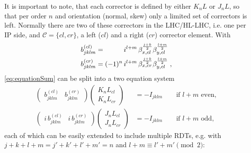 It is important to note, that each corrector is defined by either
$K_nL$ or $J_nL$, so that per order $n$ and orientation (normal, skew) only a limited set of 
correctors is left.
Normally there are two of these correctors in the LHC/HL-LHC, i.e. one per IP side,
and $\mathcal{C} = \{cl, cr\}$, a left ($cl$) and a right ($cr$) corrector element.
With
\begin{equation}
    \label{eq:BcomponentsDef}
    \begin{split}
    b_{jklm}^{(cl)} &= 
     \hphantom{(-1)^n} \, i^{l+m} \,
     \beta_{x,cl} ^{\frac{j+k}{2}} \beta_{y,cl}^{\frac{l+m}{2}} 
    \\
    b_{jklm}^{(cr)} &= 
     (-1)^n\, i^{l+m} \, 
     \beta_{x,cr} ^{\frac{j+k}{2}} \beta_{y,cl}^{\frac{l+m}{2}} \; ,
    \end{split}
\end{equation}
%
\cref{eq:equationSum} can be split into a two equation system 
%
\begin{equation}
    \label{eq:linearEqSystemSingle}
    \begin{split}
        \begin{pmatrix}
            b_{jklm}^{(cl)} & b_{jklm}^{(cr)}
        \end{pmatrix}
        \begin{pmatrix}
            K_{n}L_{cl} \\ 
            K_{n}L_{cr}
        \end{pmatrix}
        &= - I_{jklm}
        \qquad \text{if } l+m \text{ even},
        \\
        \begin{pmatrix}
            i \, b_{jklm}^{(cl)} & i \, b_{jklm}^{(cr)}
        \end{pmatrix}
        \begin{pmatrix}
            J_{n}L_{cl} \\ 
            J_{n}L_{cr}
        \end{pmatrix}
        &= - I_{jklm}
        \qquad  \text{if } l+m \text{ odd}, 
    \end{split}
\end{equation}
%
each of which can be easily extended to include multiple RDTs, e.g.
with $j+k+l+m = j'+k'+l'+m' = n$ and $l + m \equiv l' + m' \pmod 2$:
